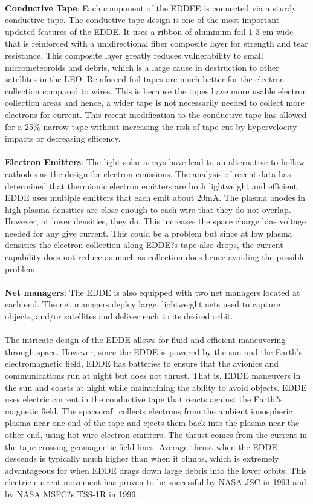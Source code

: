 \documentclass{article}
\theoremstyle{plain}			%
\theoremstyle{definition}		%
\theoremstyle{remark}
\numberwithin{equation}{section}
\numberwithin{figure}{section}
\numberwithin{table}{section}
\begin{document}
\\
\textbf{Conductive Tape}: Each component of the EDDEE is connected via a sturdy conductive tape. The conductive tape design is one of the most important updated features of the EDDE. It uses a ribbon of aluminum foil 1-3 cm wide that is reinforced with a unidirectional fiber composite layer for strength and tear resistance.  This composite layer greatly reduces vulnerability to small micrometeoroids and debris, which is a large cause in destruction to other satellites in the LEO.  Reinforced foil tapes are much better for the electron collection compared to wires. This is because the tapes have more usable electron collection areas and hence, a wider tape is not necessarily needed to collect more electrons for current. This recent modification to the conductive tape has allowed for a 25\% narrow tape without increasing the risk of tape cut by hypervelocity impacts or decreasing efficency.\\
\\
\textbf{Electron Emitters}: The light solar arrays have lead to an alternative to hollow cathodes as the design for electron emissions.  The analysis of recent data has determined that thermionic electron emitters are both lightweight and efficient. EDDE uses multiple emitters that each emit about 20mA. The plasma anodes in high plasma densities are close enough to each wire that they do not overlap. However, at lower densities, they do.  This increases the space charge bias voltage needed for any give current. This could be a problem but since at low plasma densities the electron collection along EDDE?s tape also drops, the current capability does not reduce as much as collection does hence avoiding the possible problem.\\
\\
\textbf{Net managers}: The EDDE is also equipped with two net managers located at each end.  The net managers deploy large, lightweight nets used to capture objects, and/or satellites and deliver each to its desired orbit.\\
\\
The intricate design of the EDDE allows for fluid and efficient maneuvering through space.  However, since the EDDE is powered by the sun and the Earth's electromagnetic field, EDDE has batteries to ensure that the avionics and communications run at night but does not thrust. That is, EDDE maneuvers in the sun and coasts at night while maintaining the ability to avoid objects. EDDE uses electric current in the conductive tape that reacts against the Earth?s magnetic field. The spacecraft collects electrons from the ambient ionospheric plasma near one end of the tape and ejects them back into the plasma near the other end, using hot-wire electron emitters. The thrust comes from the current in the tape crossing geomagnetic field lines. Average thrust when the EDDE descends is typically much higher than when it climbs, which is extremely advantageous for when EDDE drags down large debris into the lower orbits. This electric current movement has proven to be successful by NASA JSC in 1993 and by NASA MSFC?s TSS-1R in 1996.\\
\end{document}
